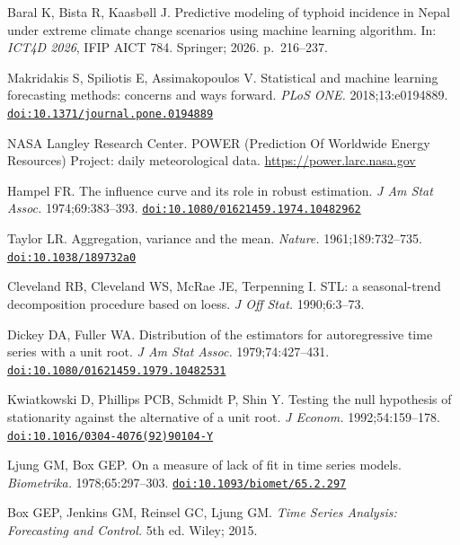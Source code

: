 \documentclass[11pt]{article}
\begin{document}
\begin{enumerate}[label={[\arabic*]},leftmargin=2.2em,itemsep=0.5pt]
\item\hypertarget{ref9}{}Baral K, Bista R, Kaasbøll J. Predictive modeling of typhoid incidence in Nepal under extreme climate change scenarios using machine learning algorithm. In: \textit{ICT4D 2026}, IFIP AICT 784. Springer; 2026. p.~216--237.
\item\hypertarget{ref10}{}Makridakis S, Spiliotis E, Assimakopoulos V. Statistical and machine learning forecasting methods: concerns and ways forward. \textit{PLoS ONE.} 2018;13:e0194889. \href{https://doi.org/10.1371/journal.pone.0194889}{\nolinkurl{doi:10.1371/journal.pone.0194889}}
\item\hypertarget{ref11}{}NASA Langley Research Center. POWER (Prediction Of Worldwide Energy Resources) Project: daily meteorological data. \url{https://power.larc.nasa.gov}
\item\hypertarget{ref12}{}Hampel FR. The influence curve and its role in robust estimation. \textit{J Am Stat Assoc.} 1974;69:383--393. \href{https://doi.org/10.1080/01621459.1974.10482962}{\nolinkurl{doi:10.1080/01621459.1974.10482962}}
\item\hypertarget{ref13}{}Taylor LR. Aggregation, variance and the mean. \textit{Nature.} 1961;189:732--735. \href{https://doi.org/10.1038/189732a0}{\nolinkurl{doi:10.1038/189732a0}}
\item\hypertarget{ref14}{}Cleveland RB, Cleveland WS, McRae JE, Terpenning I. STL: a seasonal-trend decomposition procedure based on loess. \textit{J Off Stat.} 1990;6:3--73.
\item\hypertarget{ref15}{}Dickey DA, Fuller WA. Distribution of the estimators for autoregressive time series with a unit root. \textit{J Am Stat Assoc.} 1979;74:427--431. \href{https://doi.org/10.1080/01621459.1979.10482531}{\nolinkurl{doi:10.1080/01621459.1979.10482531}}
\item\hypertarget{ref16}{}Kwiatkowski D, Phillips PCB, Schmidt P, Shin Y. Testing the null hypothesis of stationarity against the alternative of a unit root. \textit{J Econom.} 1992;54:159--178. \href{https://doi.org/10.1016/0304-4076(92)90104-Y}{\nolinkurl{doi:10.1016/0304-4076(92)90104-Y}}
\item\hypertarget{ref17}{}Ljung GM, Box GEP. On a measure of lack of fit in time series models. \textit{Biometrika.} 1978;65:297--303. \href{https://doi.org/10.1093/biomet/65.2.297}{\nolinkurl{doi:10.1093/biomet/65.2.297}}
\item\hypertarget{ref18}{}Box GEP, Jenkins GM, Reinsel GC, Ljung GM. \textit{Time Series Analysis: Forecasting and Control.} 5th ed. Wiley; 2015.

\end{enumerate}
\end{document}
